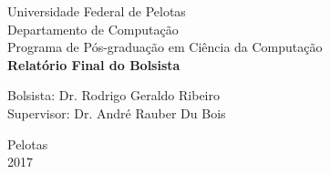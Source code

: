 \documentclass[a4paper, 12pt]{article}
\begin{document}

\begin{titlepage}
    \begin{center}
    

        \Huge{Universidade Federal de Pelotas}\\
        \large{Departamento de Computação}\\ 
        \large{Programa de Pós-graduação em Ciência da Computação}\\ 
        \vspace{15pt}
        \vspace{95pt}
        \textbf{\LARGE{Relatório Final do Bolsista}}\\
        \vspace{3,5cm}
    \end{center}
    
    \begin{center}
            Bolsista: Dr. Rodrigo Geraldo Ribeiro\\
            Supervisor: Dr. André Rauber Du Bois\\
        \end{center}
    \vspace{1cm}
    
    \begin{center}
        \vspace{\fill}
             Pelotas\\
             2017
     \end{center}
\end{titlepage}

\end{document}
